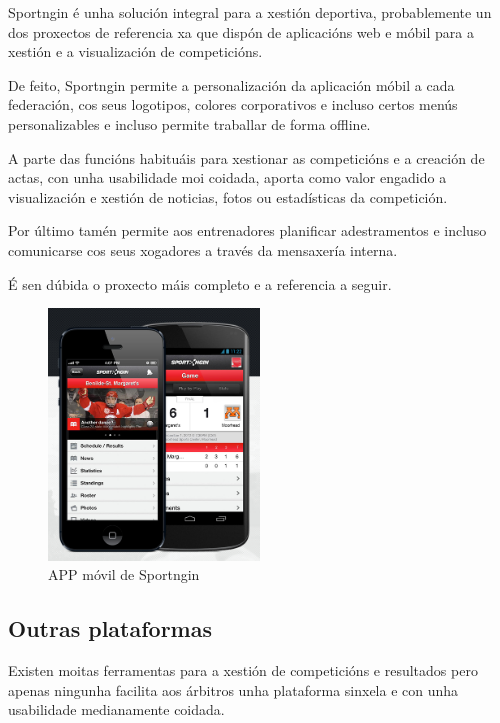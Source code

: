     Sportngin é unha solución integral para a xestión deportiva, probablemente un dos 
proxectos de referencia xa que dispón de aplicacións web e móbil para a xestión e a 
visualización de competicións.

    De feito, Sportngin permite a personalización da aplicación móbil a cada federación, 
cos seus logotipos, colores corporativos e incluso certos menús personalizables 
e incluso permite traballar de forma offline.
    
    A parte das funcións habituáis para xestionar as competicións e a creación de actas, 
con unha usabilidade moi coidada, aporta como valor engadido a visualización e xestión de 
noticias, fotos ou estadísticas da competición.

    Por último tamén permite aos entrenadores planificar adestramentos e incluso 
comunicarse cos seus xogadores a través da mensaxería interna.

    É sen dúbida o proxecto máis completo e a referencia a seguir.
 
    \begin{figure}[h!]
      \begin{center}
	\includegraphics[width=0.5\textwidth]{./img/sportngin-app.png}
	\caption{APP móvil de Sportngin}
      \end{center}
    \end{figure}

\clearpage

    \subsection{Outras plataformas}
    Existen moitas ferramentas para a xestión de competicións e resultados pero apenas 
ningunha facilita aos árbitros unha plataforma sinxela e con unha usabilidade 
medianamente coidada.
    

